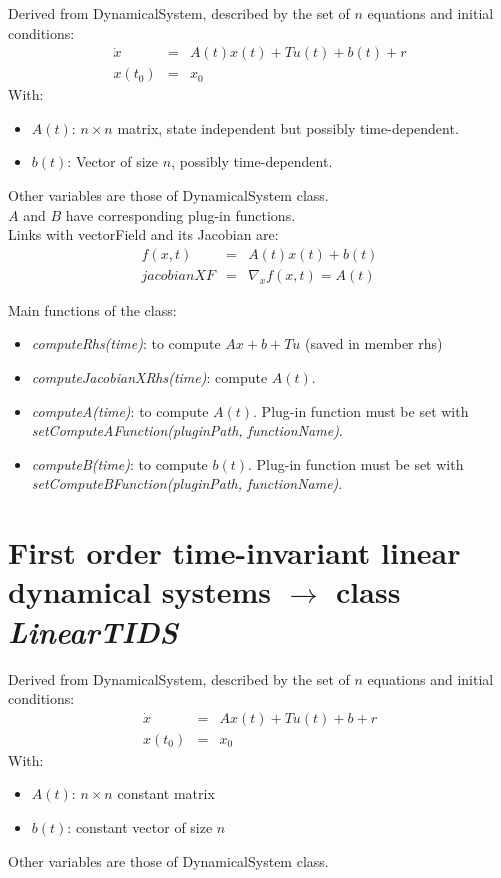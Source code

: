\documentclass[10pt]{article}
\begin{document}
Derived from DynamicalSystem, described by the set of $n$ equations and initial conditions: 
\begin{eqnarray}
  \dot x &=& A(t)x(t)+Tu(t)+b(t)+r \\
  x(t_0)&=&x_0 
\end{eqnarray}
With:
\begin{itemize}
\item $A(t)$: $n\times n$ matrix, state independent but possibly time-dependent.
\item $b(t)$: Vector of size $n$, possibly time-dependent.
\end{itemize}
Other variables are those of DynamicalSystem class. \\
$A$ and $B$ have corresponding plug-in functions. \\

Links with vectorField and its Jacobian are: 
\begin{eqnarray}
  f(x,t) &=& A(t)x(t)+b(t) \\
  jacobianXF&=&\nabla_x f(x,t) = A(t) 
\end{eqnarray}

Main functions of the class:
\begin{itemize}
\item \textit{computeRhs(time)}: to compute $Ax+b+Tu$ (saved in member rhs)
\item \textit{computeJacobianXRhs(time)}: compute $A(t)$.
\item \textit{computeA(time)}: to compute $A(t)$. Plug-in function must be set with \textit{setComputeAFunction(pluginPath, functionName)}. 
\item \textit{computeB(time)}: to compute $b(t)$. Plug-in function must be set with \textit{setComputeBFunction(pluginPath, functionName)}.
\end{itemize}

\section{First order time-invariant linear dynamical systems $\rightarrow$ class \textit{LinearTIDS}}

Derived from DynamicalSystem, described by the set of $n$ equations and initial conditions: 
\begin{eqnarray}
  \dot x &=& Ax(t)+Tu(t)+b+r \\
  x(t_0)&=&x_0 
\end{eqnarray}
With:
\begin{itemize}
\item $A(t)$: $n\times n$ constant matrix
\item $b(t)$: constant vector of size $n$
\end{itemize}
Other variables are those of DynamicalSystem class. \\
\end{document}
